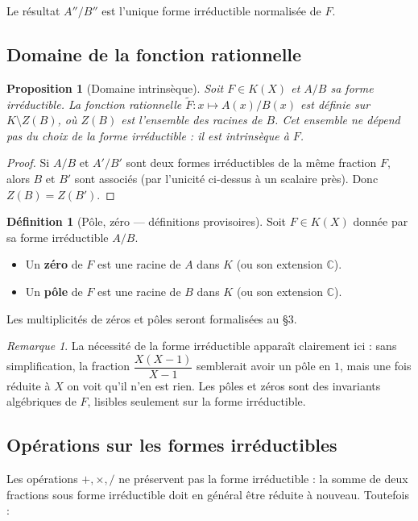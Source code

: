 \documentclass[12pt,a4paper]{report}
\newtheorem{proposition}[theoreme]{Proposition}
\theoremstyle{definition}
\newtheorem{definition}{Définition}[section]
\theoremstyle{remark}
\newtheorem{remarque}{Remarque}[section]
\begin{document}
Le résultat $A''/B''$ est l'unique forme irréductible normalisée de $F$.

\subsection{Domaine de la fonction rationnelle}

\begin{proposition}[Domaine intrinsèque]
Soit $F \in K(X)$ et $A/B$ sa forme irréductible. La fonction rationnelle $\widetilde{F} : x \mapsto A(x)/B(x)$ est définie sur $K \setminus Z(B)$, où $Z(B)$ est l'ensemble des racines de $B$. Cet ensemble \emph{ne dépend pas} du choix de la forme irréductible : il est intrinsèque à $F$.
\end{proposition}

\begin{proof}
Si $A/B$ et $A'/B'$ sont deux formes irréductibles de la même fraction $F$, alors $B$ et $B'$ sont associés (par l'unicité ci-dessus à un scalaire près). Donc $Z(B) = Z(B')$.
\end{proof}

\begin{definition}[Pôle, zéro --- définitions provisoires]
Soit $F \in K(X)$ donnée par sa forme irréductible $A/B$.
\begin{itemize}
    \item Un \textbf{zéro} de $F$ est une racine de $A$ dans $K$ (ou son extension $\mathbb{C}$).
    \item Un \textbf{pôle} de $F$ est une racine de $B$ dans $K$ (ou son extension $\mathbb{C}$).
\end{itemize}
Les multiplicités de zéros et pôles seront formalisées au §3.
\end{definition}

\begin{remarque}
La nécessité de la forme irréductible apparaît clairement ici : sans simplification, la fraction $\dfrac{X(X-1)}{X-1}$ semblerait avoir un pôle en $1$, mais une fois réduite à $X$ on voit qu'il n'en est rien. Les pôles et zéros sont des invariants algébriques de $F$, lisibles seulement sur la forme irréductible.
\end{remarque}

\subsection{Opérations sur les formes irréductibles}

Les opérations $+, \times, /$ ne préservent pas la forme irréductible : la somme de deux fractions sous forme irréductible doit en général être réduite à nouveau. Toutefois :
\end{document}

